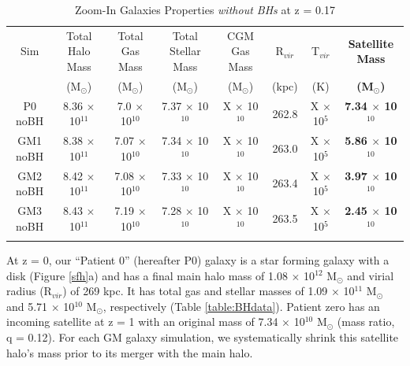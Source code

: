 \documentclass[]{emulateapj}
\begin{document}
\begin{table}[ht!]
\end{table}\begin{table}[ht] %
\caption{Zoom-In Galaxies Properties \textit{without BHs} at  z = 0.17} %
\centering %
\begin{tabular}{c c c c c c c c} %
\hline\hline %
Sim & Total Halo Mass  & Total Gas Mass & Total Stellar Mass & CGM Gas Mass & R$_{vir}$ & T$_{vir}$ & \textbf{Satellite Mass}\\
 & (M$_{\odot}$) & (M$_{\odot}$) & (M$_{\odot}$) & (M$_{\odot}$) & (kpc) & (K) & \textbf{(M$_{\odot}$)} \\ [0.5ex] %
\hline %
P0 noBH & 8.36 $\times$ 10$^{11}$ & 7.0 $\times$ 10$^{10}$ & 7.37 $\times$ 10$^{10}$ & X $\times$ 10$^{10}$ & 262.8 & X $\times$ 10$^5$ & \textbf{7.34 $\times$ 10$^{10}$}\\ %
GM1 noBH & 8.38 $\times$ 10$^{11}$ & 7.07 $\times$ 10$^{10}$ & 7.34 $\times$ 10$^{10}$ & X $\times$ 10$^{10}$ & 263.0 & X $\times$ 10$^5$ & \textbf{5.86 $\times$ 10$^{10}$}\\
GM2 noBH & 8.42 $\times$ 10$^{11}$ & 7.08 $\times$ 10$^{10}$ & 7.33 $\times$ 10$^{10}$ & X $\times$ 10$^{10}$ & 263.4 & X $\times$ 10$^5$ & \textbf{3.97 $\times$ 10$^{10}$}  \\ %

GM3 noBH & 8.43 $\times$ 10$^{11}$ & 7.19 $\times$ 10$^{10}$ & 7.28 $\times$ 10$^{10}$ & X $\times$ 10$^{10}$ & 263.5 & X $\times$ 10$^5$ & \textbf{2.45 $\times$ 10$^{10}$} \\ [1ex] %
\hline %
\vspace{5.111mm}
\end{tabular}
\label{table:noBHdata} %
\end{table}



At z = 0, our ``Patient 0'' (hereafter P0) galaxy is a star forming galaxy with a disk (Figure \ref{sfh}a) and has a final main halo mass of 1.08 $\times$ 10$^{12}$ M$_{\odot}$ and virial radius (R$_{vir}$) of 269 kpc. It has total gas and stellar masses of 1.09 $\times$ 10$^{11}$ M$_{\odot}$ and 5.71 $\times$ 10$^{10}$ M$_{\odot}$, respectively (Table \ref{table:BHdata}). Patient zero has an incoming satellite at z = 1 with an original mass of 7.34 $\times$ 10$^{10}$ M$_{\odot}$ (mass ratio, q = 0.12). For each GM galaxy simulation, we systematically shrink this satellite halo's mass prior to its merger with the main halo.
\end{document}
